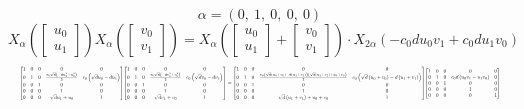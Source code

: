 \documentclass[11pt]{article}
\theoremstyle{definition}
\begin{document}
\[
\alpha = \left( 0, \  1, \  0, \  0, \  0\right)
\]
\[
X_{\alpha}\left(\left[\begin{matrix}u_{0}\\u_{1}\end{matrix}\right]\right) X_{\alpha}\left(\left[\begin{matrix}v_{0}\\v_{1}\end{matrix}\right]\right) = X_{\alpha}\left(\left[\begin{matrix}u_{0}\\u_{1}\end{matrix}\right] + \left[\begin{matrix}v_{0}\\v_{1}\end{matrix}\right]\right) \cdot X_{2\alpha}\left(- c_{0} d u_{0} v_{1} + c_{0} d u_{1} v_{0}\right)
\]
\[
\resizebox{\textwidth}{!}{${\left[\begin{matrix}1 & 0 & 0 & 0 & 0\\0 & 1 & 0 & \frac{c_{0} \sqrt{d} \left(- d u_{1}^{2} + u_{0}^{2}\right)}{2} & c_{0} \left(\sqrt{d} u_{0} - d u_{1}\right)\\0 & 0 & 1 & 0 & 0\\0 & 0 & 0 & 1 & 0\\0 & 0 & 0 & \sqrt{d} u_{1} + u_{0} & 1\end{matrix}\right]} {\left[\begin{matrix}1 & 0 & 0 & 0 & 0\\0 & 1 & 0 & \frac{c_{0} \sqrt{d} \left(- d v_{1}^{2} + v_{0}^{2}\right)}{2} & c_{0} \left(\sqrt{d} v_{0} - d v_{1}\right)\\0 & 0 & 1 & 0 & 0\\0 & 0 & 0 & 1 & 0\\0 & 0 & 0 & \sqrt{d} v_{1} + v_{0} & 1\end{matrix}\right]} = {\left[\begin{matrix}1 & 0 & 0 & 0 & 0\\0 & 1 & 0 & \frac{c_{0} \left(\sqrt{d} \left(u_{0} + v_{0}\right) - d \left(u_{1} + v_{1}\right)\right) \left(\sqrt{d} \left(u_{1} + v_{1}\right) + u_{0} + v_{0}\right)}{2} & c_{0} \left(\sqrt{d} \left(u_{0} + v_{0}\right) - d \left(u_{1} + v_{1}\right)\right)\\0 & 0 & 1 & 0 & 0\\0 & 0 & 0 & 1 & 0\\0 & 0 & 0 & \sqrt{d} \left(u_{1} + v_{1}\right) + u_{0} + v_{0} & 1\end{matrix}\right]} {\left[\begin{matrix}1 & 0 & 0 & 0 & 0\\0 & 1 & 0 & c_{0} d \left(u_{0} v_{1} - u_{1} v_{0}\right) & 0\\0 & 0 & 1 & 0 & 0\\0 & 0 & 0 & 1 & 0\\0 & 0 & 0 & 0 & 1\end{matrix}\right]}$}
\]
\end{document}
